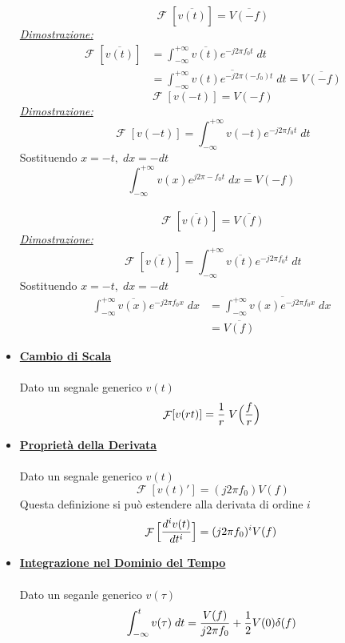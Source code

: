 \documentclass{article}
\newcommand{\Fourier}{\mathop{\mathcal{F}}}
\begin{document}
\begin{itemize}
					  \[
					  	\Fourier[\overline{v(t)}] = \overline{V(-f)}
					  \]
					  \underline{\textit{Dimostrazione:}}
					  \[
					  	\begin{aligned}
					  		\Fourier[\overline{v(t)}] &= \int_{-\infty}^{+\infty} {\overline{v(t)} e^{-j2\pi f_0t}\; dt} \\
							&= \int_{-\infty}^{+\infty} {\overline{v(t) e^{-j2\pi (-f_0)t}}\; dt} = \overline{V(-f)}
					  	\end{aligned}
					  \]
					  \[
					  	\Fourier[v(-t)] = V(-f)
 					  \]
					  \underline{\textit{Dimostrazione:}}
					  \[
					  	\Fourier[v(-t)] = \int_{-\infty}^{+\infty} {v(-t) e^{-j2\pi f_0 t}\; dt}
					  \]
					  Sostituendo $ x = -t,\; dx = -dt $
					  \[
					  	\int_{-\infty}^{+\infty} {v(x) e^{j2\pi -f_0 t}\; dx} = V(-f)
					  \]
					  \\
					  \[
					  	\Fourier[\overline{v(t)}] = \overline{V(f)}
					  \]
					  \underline{\textit{Dimostrazione:}}
					  \[
					  	\Fourier[\overline{v(t)}] = \int_{-\infty}^{+\infty} {\overline{v(t)} e^{-j2\pi f_0t}\; dt}
					  \]
					  Sostituendo $ x = -t,\; dx = -dt $
					  \[
					  	\begin{aligned}
							\int_{-\infty}^{+\infty} {\overline{v(x)} e^{-j2\pi f_0x}\; dx} &= \int_{-\infty}^{+\infty} {\overline{v(x) e^{-j2\pi f_0x}}\; dx} \\
							&= \overline{V(f)}
					  	\end{aligned}
					  \]
				\item \underline{\textbf{Cambio di Scala}} \\
					  \\
					  Dato un segnale generico $ v(t) $
					  \[
					  	\Fourier[v(rt)] = {1\over{r}}\; V\Big({f\over{r}}\Big)
					  \]
				\item \underline{\textbf{Proprietà della Derivata}} \\
					  \\
					  Dato un segnale generico $ v(t) $
					  \[
					  	\Fourier[v(t)'] = (j2\pi f_0) V(f)
					  \]
					  Questa definizione si può estendere alla derivata di ordine $ i $
					  \[
					  	\Fourier\Big[{{d^i v(t)}\over{dt^i}}\Big] = (j2\pi f_0)^i V(f)
					  \]
				\item \underline{\textbf{Integrazione nel Dominio del Tempo}} \\
					  \\
					  Dato un seganle generico $ v(\tau) $
					  \[
					  	\int_{-\infty}^{t} {v(\tau)\; dt} = {{V(f)}\over{j2\pi f_0}} + {1\over{2}}V(0)\delta(f)
\]
\end{itemize}
\end{document}
